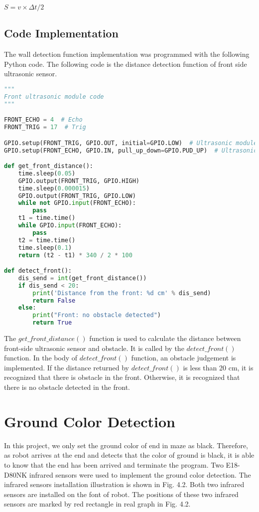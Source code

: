 \documentclass[11pt,times,oneside,openright,hardcopy]{eeereport}
\begin{document}
\begin{center}
    $ S = v \times \Delta t / 2$    
\end{center}

\subsection{Code Implementation}
The wall detection function implementation was programmed with the following Python code.
The following code is the distance detection function of front side ultrasonic sensor. 
\begin{lstlisting}[language=Python]
"""
Front ultrasonic module code
"""

FRONT_ECHO = 4  # Echo
FRONT_TRIG = 17  # Trig

GPIO.setup(FRONT_TRIG, GPIO.OUT, initial=GPIO.LOW)  # Ultrasonic module transmitter setting
GPIO.setup(FRONT_ECHO, GPIO.IN, pull_up_down=GPIO.PUD_UP)  # Ultrasonic module receiver setting

def get_front_distance():
    time.sleep(0.05)
    GPIO.output(FRONT_TRIG, GPIO.HIGH)
    time.sleep(0.000015)
    GPIO.output(FRONT_TRIG, GPIO.LOW)
    while not GPIO.input(FRONT_ECHO):
        pass
    t1 = time.time()
    while GPIO.input(FRONT_ECHO):
        pass
    t2 = time.time()
    time.sleep(0.1)
    return (t2 - t1) * 340 / 2 * 100

def detect_front():
    dis_send = int(get_front_distance())
    if dis_send < 20:
        print('Distance from the front: %d cm' % dis_send)
        return False
    else:
        print("Front: no obstacle detected")
        return True
\end{lstlisting}
The $get\_front\_distance()$ function is used to calculate the distance 
between front-side ultrasonic sensor and obstacle.
It is called  by the $detect\_front()$ function. In the body of $detect\_front()$ function, an obstacle judgement is implemented.
If the distance returned by $detect\_front()$ is less than 20 cm, it is recognized that there is obstacle in the front.
Otherwise, it is recognized that there is no obstacle detected in the front.


\section{Ground Color Detection}
In this project, we only set the ground color of end in maze as black. Therefore, as robot arrives at the end and detects that the color of ground is black,
it is able to know that the end has been arrived and terminate the program.
Two E18-D80NK infrared sensors were used to implement the ground color detection. The infrared sensors installation illustration is shown in Fig. 4.2.
Both two infrared sensors are installed on the font of robot.
The positions of these two infrared sensors are marked by red rectangle in real graph in Fig. 4.2.
\end{document}
